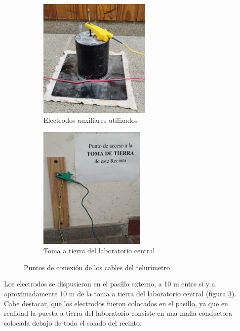 \begin{figure}[h!]
        \begin{subfigure}[b]{0.5\textwidth}
        \centering  
        \includegraphics[width=0.6\textwidth]{Imagenes/ElectrodoTel.jpeg}
        \caption{Electrodos auxiliares utilizados}
        \label{fig:electrodos}
    \end{subfigure}
    \hfill
    \begin{subfigure}[b]{0.49\textwidth}
        \centering
        \includegraphics[width=0.57\textwidth]{Imagenes/TomaTierra.jpeg}
        \caption{Toma a tierra del laboratorio central}
        \label{fig:tomatierra}
    \end{subfigure}
    \caption{Puntos de conexión de los cables del telurímetro}
\end{figure}

Los electrodos se dispusieron en el pasillo externo, a 10 m entre sí y a aproximadamente 10 m de la toma a tierra del laboratorio central (figura \ref{fig:tomatierra}). Cabe destacar, que los electrodos fueron colocados en el pasillo, ya que en realidad la puesta a tierra del laboratorio consiste en una malla conductora colocada debajo de todo el solado del recinto. 


